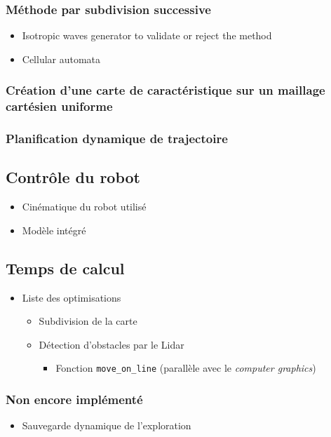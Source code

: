 \documentclass[../main.tex]{subfiles}
\begin{document}
\subsubsection*{Méthode par subdivision successive}

\begin{itemize}
	\item Isotropic waves generator to validate or reject the method
		\item Cellular automata
\end{itemize}

\subsubsection*{Création d'une carte de caractéristique sur un maillage cartésien uniforme}
\subsubsection*{Planification dynamique de trajectoire}

\subsection*{Contrôle du robot}
\begin{itemize}
    \item Cinématique du robot utilisé
    \item Modèle intégré
\end{itemize}

\subsection*{Temps de calcul}
\begin{itemize}
    \item Liste des optimisations
    \begin{itemize}
        \item Subdivision de la carte
        \item Détection d'obstacles par le Lidar
        \begin{itemize}
            \item Fonction \texttt{move\_on\_line} (parallèle avec le \emph{computer graphics})
        \end{itemize}
    \end{itemize}
\end{itemize}


\subsubsection*{Non encore implémenté}
\begin{itemize}
    \item Sauvegarde dynamique de l'exploration
\end{itemize}
\end{document}
